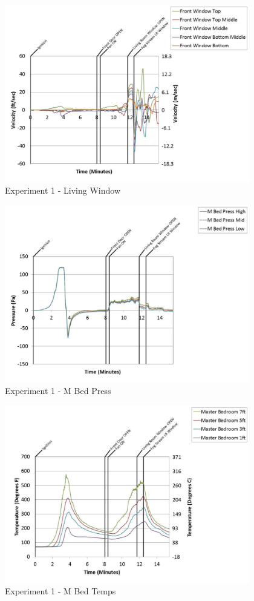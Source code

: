 \documentclass{article}
\begin{document}
\begin{appendices}
	\begin{figure}[h!]
		\centering
		\includegraphics[height=3.05in]{0_Images/Results_Charts/Exp_1_Charts/LivingWindow.pdf}
		\caption{Experiment 1 - Living Window}
	\end{figure}
 
	\clearpage

	\begin{figure}[h!]
		\centering
		\includegraphics[height=3.05in]{0_Images/Results_Charts/Exp_1_Charts/MBedPress.pdf}
		\caption{Experiment 1 - M Bed Press}
	\end{figure}
 

	\begin{figure}[h!]
		\centering
		\includegraphics[height=3.05in]{0_Images/Results_Charts/Exp_1_Charts/MBedTemps.pdf}
		\caption{Experiment 1 - M Bed Temps}
	\end{figure}
 

\end{appendices}
\end{document}
